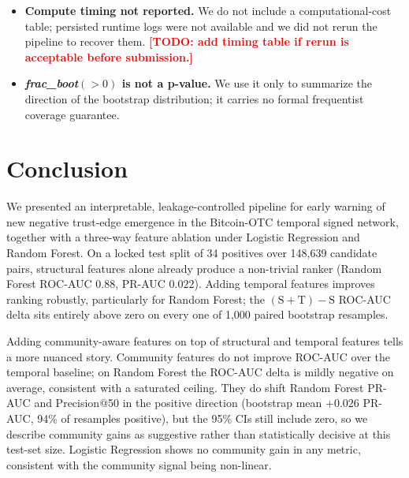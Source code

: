\documentclass[conference]{IEEEtran}
\newcommand{\code}[1]{\texttt{#1}}
\newcommand{\todo}[1]{\textcolor{red}{\textbf{[TODO: #1]}}}
\begin{document}
\begin{itemize}
With \code{n\_jobs = -1}, RF probabilities can differ at the
float-tie boundary between two independent fits. This produced a
$\sim 0.01$ PR-AUC drift between the original Stage~7 metrics and the
canonical metrics in Table~\ref{tab:test_metrics}; the drift is well
inside the bootstrap CI and does not change any qualitative
conclusion.
\item \textbf{Compute timing not reported.} We do not include a
computational-cost table; persisted runtime logs were not available
and we did not rerun the pipeline to recover them. \todo{add timing
table if rerun is acceptable before submission.}
\item \textbf{\emph{frac\_boot}$(>0)$ is not a p-value.} We use it
only to summarize the direction of the bootstrap distribution; it
carries no formal frequentist coverage guarantee.
\end{itemize}

\section{Conclusion}

We presented an interpretable, leakage-controlled pipeline for early
warning of new negative trust-edge emergence in the Bitcoin-OTC
temporal signed network, together with a three-way feature ablation
under Logistic Regression and Random Forest. On a locked test split
of 34 positives over 148{,}639 candidate pairs, structural features
alone already produce a non-trivial ranker (Random Forest ROC-AUC
$0.88$, PR-AUC $0.022$). Adding temporal features improves ranking
robustly, particularly for Random Forest; the
$(\mathrm{S}{+}\mathrm{T}) - \mathrm{S}$ ROC-AUC delta sits entirely
above zero on every one of 1{,}000 paired bootstrap resamples.

Adding community-aware features on top of structural and temporal
features tells a more nuanced story. Community features do not
improve ROC-AUC over the temporal baseline; on Random Forest the
ROC-AUC delta is mildly negative on average, consistent with a
saturated ceiling. They do shift Random Forest PR-AUC and
Precision@50 in the positive direction (bootstrap mean
$+0.026$ PR-AUC, 94\% of resamples positive), but the 95\% CIs still
include zero, so we describe community gains as suggestive rather
than statistically decisive at this test-set size. Logistic
Regression shows no community gain in any metric, consistent with the
community signal being non-linear.
\end{document}
